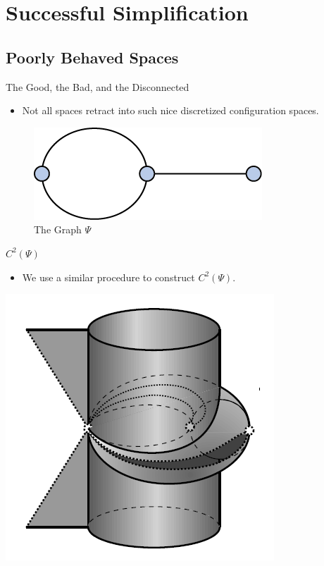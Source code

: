 \documentclass{beamer}
\begin{document}
\section{Successful Simplification}
\subsection{Poorly Behaved Spaces}

\begin{frame}{The Good, the Bad, and the Disconnected}

\begin{itemize}
\item Not all spaces retract into such nice discretized configuration spaces.\pause
\end{itemize}

\begin{figure}
\centering
\includegraphics{Thesis/Bad.png}
\caption{The Graph $\Psi$}
\end{figure}
\end{frame}

\begin{frame}{$C^2(\Psi)$}
\begin{itemize}
\item We use a similar procedure to construct $C^2(\Psi)$.\pause
\end{itemize}

\centering
\includegraphics[scale=.5]{Thesis/Bad_C.png}

\end{frame}
\end{document}
